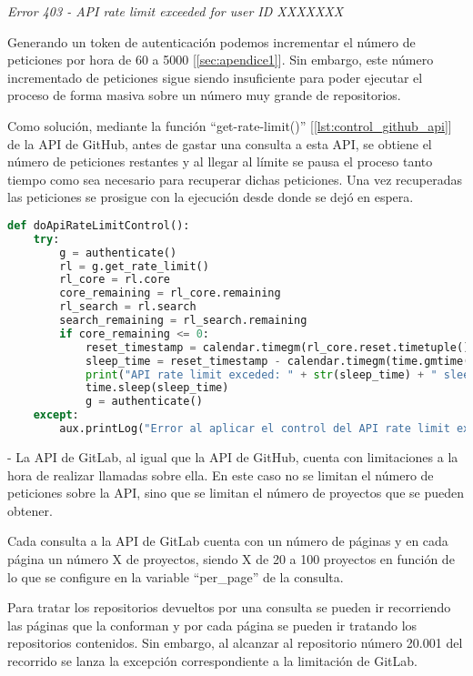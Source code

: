 \textit{Error 403 - API rate limit exceeded for user ID XXXXXXX}

Generando un token de autenticación podemos incrementar el número de peticiones por hora de 60 a 5000 [\ref{sec:apendice1}]. Sin embargo, este número incrementado de peticiones sigue siendo insuficiente para poder ejecutar el proceso de forma masiva sobre un número muy grande de repositorios.

Como solución, mediante la función ``get-rate-limit()'' [\ref{lst:control_github_api}] de la API de GitHub, antes de gastar una consulta a esta API, se obtiene el número de peticiones restantes y al llegar al límite se pausa el proceso tanto tiempo como sea necesario para recuperar dichas peticiones. Una vez recuperadas las peticiones se prosigue con la ejecución desde donde se dejó en espera.

\begin{lstlisting}[language=Python, caption=Control del nº de peticiones a la API GitHub, label={lst:control_github_api}]
def doApiRateLimitControl():
    try:
        g = authenticate()
        rl = g.get_rate_limit()
        rl_core = rl.core
        core_remaining = rl_core.remaining
        rl_search = rl.search
        search_remaining = rl_search.remaining
        if core_remaining <= 0:
            reset_timestamp = calendar.timegm(rl_core.reset.timetuple())
            sleep_time = reset_timestamp - calendar.timegm(time.gmtime()) + 5
            print("API rate limit exceded: " + str(sleep_time) + " sleep_time. Waiting...")
            time.sleep(sleep_time)
            g = authenticate()
    except:
        aux.printLog("Error al aplicar el control del API rate limit exceded...", logging.ERROR)
\end{lstlisting}

- La API de GitLab, al igual que la API de GitHub, cuenta con limitaciones a la hora de realizar llamadas sobre ella. En este caso no se limitan el número de peticiones sobre la API, sino que se limitan el número de proyectos que se pueden obtener.

Cada consulta a la API de GitLab cuenta con un número de páginas y en cada página un número X de proyectos, siendo X de 20 a 100 proyectos en función de lo que se configure en la variable ``per\_page'' de la consulta. 

Para tratar los repositorios devueltos por una consulta se pueden ir recorriendo las páginas que la conforman y por cada página se pueden ir tratando los repositorios contenidos. Sin embargo, al alcanzar al repositorio número 20.001 del recorrido se lanza la excepción correspondiente a la limitación de GitLab.

